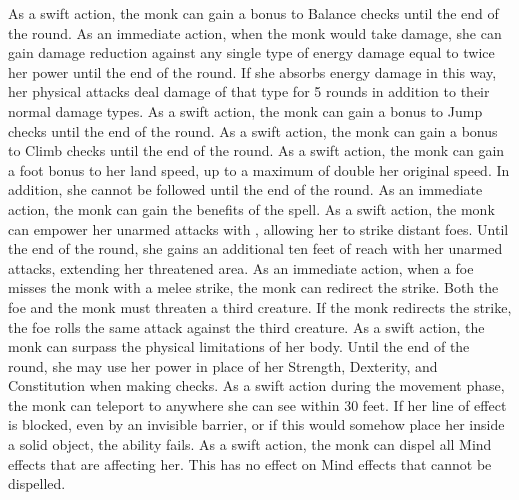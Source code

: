         As a swift action, the monk can gain a  bonus to Balance checks until the end of the round.
        As an immediate action, when the monk would take  damage, she can gain damage reduction against any single type of energy damage equal to twice her \ki power until the end of the round.
        If she absorbs energy damage in this way, her physical attacks deal damage of that type for 5 rounds in addition to their normal damage types.
        As a swift action, the monk can gain a  bonus to Jump checks until the end of the round.
        As a swift action, the monk can gain a  bonus to Climb checks until the end of the round.
        As a swift action, the monk can gain a  foot bonus to her land speed, up to a maximum of double her original speed.
        In addition, she cannot be followed until the end of the round.
        As an immediate action, the monk can gain the benefits of the  spell.
        As a swift action, the monk can empower her unarmed attacks with \ki, allowing her to strike distant foes.
        Until the end of the round, she gains an additional ten feet of reach with her unarmed attacks, extending her threatened area.
        As an immediate action, when a foe misses the monk with a melee strike, the monk can redirect the strike.
        Both the foe and the monk must threaten a third creature.
        If the monk redirects the strike, the foe rolls the same attack against the third creature.
        As a swift action, the monk can surpass the physical limitations of her body.
        Until the end of the round, she may use her \ki power in place of her Strength, Dexterity, and Constitution when making checks.
        As a swift action during the movement phase, the monk can teleport to anywhere she can see within 30 feet.
        If her line of effect is blocked, even by an invisible barrier, or if this would somehow place her inside a solid object, the ability fails.
        As a swift action, the monk can dispel all Mind effects that are affecting her.
        This has no effect on Mind effects that cannot be dispelled.
